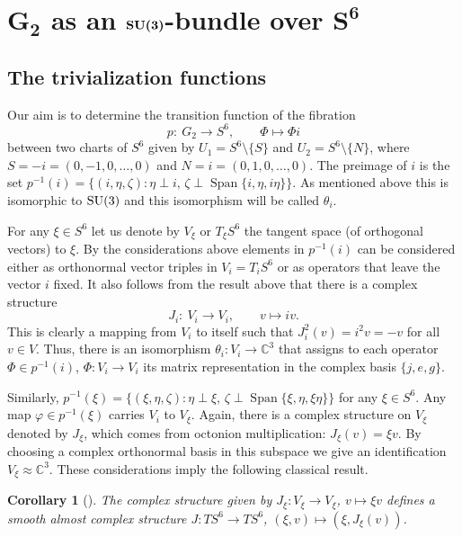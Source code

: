 \documentclass[10pt,a4paper]{amsart}
\numberwithin{equation}{section}
\newtheorem{Corollary}[Theorem]{Corollary}
\DeclareMathOperator{\Span}{Span}
\newcommand{\SC}{\mathbb{C}} %
\begin{document}
\section[$G_2$ as an ${\rm SU}(3)$-bundle over $S^6$]{$\boldsymbol{G_2}$ as an $\boldsymbol{{\rm SU}(3)}$-bundle over $\boldsymbol{S^6}$}\label{section3}

\subsection{The trivialization functions}\label{section3.1}

Our aim is to determine the transition function of the fibration
\[p\colon \ G_2 \rightarrow S^6, \qquad \Phi \mapsto \Phi i\]
between two charts of $S^6$ given by $U_1=S^6 {\setminus} \{S\} $ and $U_2=S^6 {\setminus} \{N\}$, where $S=-i=(0,-1,0,\dots,0)$ and $N=i=(0,1,0,\dots,0)$. The preimage of $i$ is the set $p^{-1}(i)=\{(i,\eta,\zeta)\colon \eta \perp i, \,\zeta \perp \Span \{i,\eta, i \eta \} \}$. As mentioned above this is isomorphic to ${\rm SU}(3)$ and this isomorphism will be called $\theta_i$.

For any $\xi \in S^6$ let us denote by $V_\xi$ or $T_\xi S^6$ the tangent space (of orthogonal vectors) to $\xi$.
By the considerations above elements in $p^{-1}(i)$ can be considered either as orthonormal vector triples in $V_i=T_iS^6$ or as operators that leave the vector $i$ fixed.
It also follows from the result above that there is a complex structure
\[J_i\colon \ V_i \rightarrow V_i, \qquad v \mapsto iv.\]
This is clearly a mapping from $V_i$ to itself such that $J_{i}^2(v)=i^2v=-v$ for all $v \in V$. Thus, there is an isomorphism $\theta_{i}\colon V_i \rightarrow \SC^3$ that assigns to each operator $\Phi \in p^{-1}(i)$, $\Phi\colon V_i \rightarrow V_i$ its matrix representation in the complex basis $\{j,e,g\}$.

Similarly, $p^{-1}(\xi)=\{(\xi,\eta,\zeta)\colon \eta \perp \xi, \,\zeta \perp \Span \{\xi,\eta, \xi \eta \} \}$ for any $\xi \in S^6$. Any map $\varphi \in p^{-1}(\xi)$ carries $V_i$ to $V_{\xi}$. Again, there is a complex structure on $V_\xi$ denoted by $J_\xi$, which comes from octonion multiplication: $J_\xi(v)=\xi v$. By choosing a complex orthonormal basis in this subspace we give an identification $V_\xi \approx \SC^3$. These considerations imply the following classical result.

\begin{Corollary}[{\cite{ehresmann1950varietes}}] The complex structure given by $J_\xi\colon V_\xi \rightarrow V_\xi$, $v \mapsto \xi v$ defines a smooth almost complex structure $J\colon TS^6 \rightarrow TS^6$, $(\xi,v) \mapsto (\xi, J_\xi(v))$.
\end{Corollary}
\end{document}
